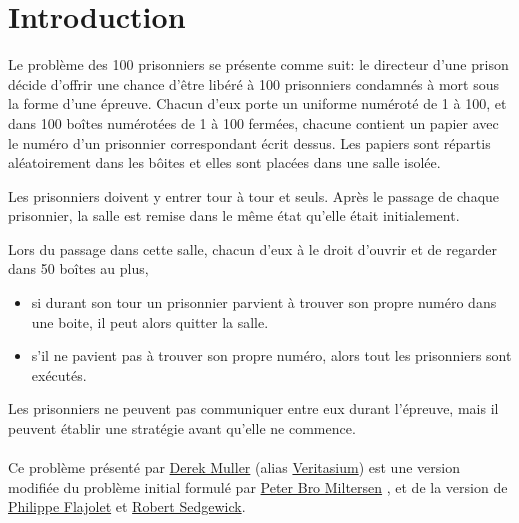 \section{Introduction}

Le problème des 100 prisonniers \cite{100PrisonersProblem2023} se présente
comme suit:
le directeur d'une prison décide d'offrir une chance d'être libéré à 100 prisonniers
condamnés à mort sous la forme d'une épreuve.
Chacun d'eux porte un uniforme numéroté de 1 à 100, et dans 100 boîtes
numérotées de 1 à 100 fermées, chacune contient un papier avec le numéro d'un
prisonnier correspondant écrit dessus.
Les papiers sont répartis aléatoirement dans les bôites et elles sont placées dans une
salle isolée.

Les prisonniers doivent y entrer tour à tour et seuls.
Après le passage de chaque prisonnier, la salle est remise dans le même
état qu'elle était initialement.

Lors du passage dans cette salle, chacun d'eux à le droit d'ouvrir
et de regarder dans 50 boîtes au plus,

\begin{itemize}
	\item
	      si durant son tour un prisonnier parvient à trouver son propre numéro
	      dans une boite, il peut alors quitter la salle.
	\item
	      s'il ne pavient pas à trouver son propre numéro, alors tout les
	      prisonniers sont exécutés.
\end{itemize}

Les prisonniers ne peuvent pas communiquer entre eux durant l'épreuve,
mais il peuvent établir une stratégie avant qu'elle ne commence.\\\\
Ce problème présenté \cite{veritasiumRiddleThatSeems2022} par
\href{https://www.veritasium.com/about}{Derek Muller}
(alias \href{https://www.youtube.com/@veritasium}{Veritasium})
est une version modifiée du problème
initial \cite{miltersenCellProbeComplexity2007} formulé par
\href{https://pure.au.dk/portal/en/persons/bromille%40cs.au.dk}{Peter Bro Miltersen}
, et de la version \cite{flajoletAnalyticCombinatorics2009} de
\href{https://fr.wikipedia.org/wiki/Philippe_Flajolet}{Philippe Flajolet}
et \href{https://sedgewick.io/}{Robert Sedgewick}.
